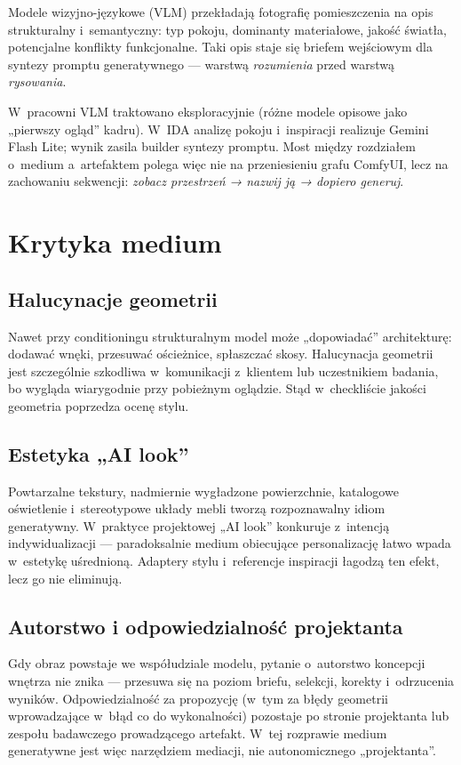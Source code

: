 Modele wizyjno-językowe (VLM) przekładają fotografię pomieszczenia na opis strukturalny i~semantyczny: typ pokoju, dominanty materiałowe, jakość światła, potencjalne konflikty funkcjonalne. Taki opis staje się briefem wejściowym dla syntezy promptu generatywnego --- warstwą \emph{rozumienia} przed warstwą \emph{rysowania}.

W~pracowni VLM traktowano eksploracyjnie (różne modele opisowe jako „pierwszy ogląd” kadru). W~IDA analizę pokoju i~inspiracji realizuje Gemini Flash Lite; wynik zasila builder syntezy promptu. Most między rozdziałem o~medium a~artefaktem polega więc nie na przeniesieniu grafu ComfyUI, lecz na zachowaniu sekwencji: \emph{zobacz przestrzeń → nazwij ją → dopiero generuj}.

\section{Krytyka medium}
\label{ch04:sec:krytyka}

\subsection{Halucynacje geometrii}
Nawet przy conditioningu strukturalnym model może „dopowiadać” architekturę: dodawać wnęki, przesuwać ościeżnice, spłaszczać skosy. Halucynacja geometrii jest szczególnie szkodliwa w~komunikacji z~klientem lub uczestnikiem badania, bo wygląda wiarygodnie przy pobieżnym oglądzie. Stąd w~checkliście jakości geometria poprzedza ocenę stylu.

\subsection{Estetyka „AI look”}
Powtarzalne tekstury, nadmiernie wygładzone powierzchnie, katalogowe oświetlenie i~stereotypowe układy mebli tworzą rozpoznawalny idiom generatywny. W~praktyce projektowej „AI look” konkuruje z~intencją indywidualizacji --- paradoksalnie medium obiecujące personalizację łatwo wpada w~estetykę uśrednioną. Adaptery stylu i~referencje inspiracji łagodzą ten efekt, lecz go nie eliminują.

\subsection{Autorstwo i odpowiedzialność projektanta}
Gdy obraz powstaje we współudziale modelu, pytanie o~autorstwo koncepcji wnętrza nie znika --- przesuwa się na poziom briefu, selekcji, korekty i~odrzucenia wyników. Odpowiedzialność za propozycję (w~tym za błędy geometrii wprowadzające w~błąd co do wykonalności) pozostaje po stronie projektanta lub zespołu badawczego prowadzącego artefakt. W~tej rozprawie medium generatywne jest więc narzędziem mediacji, nie autonomicznego „projektanta”.

